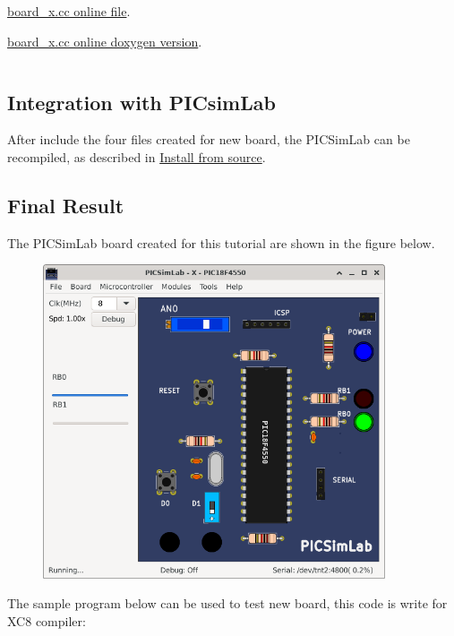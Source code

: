\href{https://github.com/lcgamboa/picsimlab/blob/master/src/boards/board_x.cc}{ board\_x.cc online file}.
 
\href{https://lcgamboa.github.io/picsimlab_docs/devel/html/index.html\#bcode}{ board\_x.cc online doxygen version}.

\inputminted[baselinestretch=1.2,fontsize=\footnotesize,linenos,bgcolor=colorbash]{c++}{files/board_x.cc}


\subsection{Integration with PICsimLab}


After include the four files created for new board, the PICSimLab can be recompiled,
as described in \hyperlink{def:isource}{Install from source}.


\subsection{Final Result}

The PICSimLab board created for this tutorial are shown in the figure below.
\begin{figure}[H]
\center
\includegraphics[width=0.9\textwidth]{img/hb/final.png} 
\end{figure} 

The sample program below can be used to test new board, this code is write for XC8 compiler:
\inputminted[baselinestretch=1.2,fontsize=\footnotesize,linenos]{c}{sample/board_x.c}

